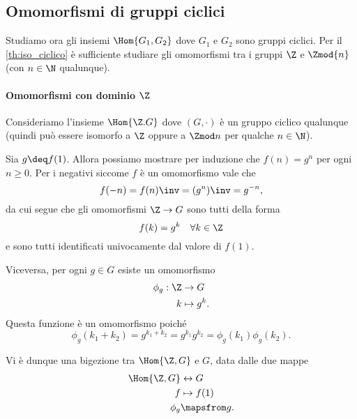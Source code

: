 \subsection{Omomorfismi di gruppi ciclici}

Studiamo ora gli insiemi $\Hom{G_1, G_2}$ dove $G_1$ e $G_2$ sono gruppi ciclici. Per il \autoref{th:iso_ciclico} è sufficiente studiare gli omomorfismi tra i gruppi $\Z$ e $\Zmod{n}$ (con $n \in \N$ qualunque).

\paragraph{Omomorfismi con dominio $\Z$} Consideriamo l'insieme $\Hom{\Z. G}$ dove $(G, \cdot)$ è un gruppo ciclico qualunque (quindi può essere isomorfo a $\Z$ oppure a $\Zmod n$ per qualche $n \in \N$). 

Sia $g \deq f(1)$. Allora possiamo mostrare per induzione che $f(n) = g^n$ per ogni $n \geq 0$. Per i negativi siccome $f$ è un omomorfismo vale che \[
    f(-n) = f(n)\inv = (g^n)\inv = g^{-n},    
\] da cui segue che gli omomorfismi $\Z \to G$ sono tutti della forma \[
    f(k) = g^k \quad \forall k \in \Z
\] e sono tutti identificati univocamente dal valore di $f(1)$.

Viceversa, per ogni $g \in G$ esiste un omomorfismo \begin{align*}
    \phi_g : \Z &\to G \\
    k &\mapsto g^k.
\end{align*} Questa funzione è un omomorfismo poiché \[
    \phi_g(k_1 + k_2) = g^{k_1 + k_2} = g^{k_1}g^{k_2} = \phi_g(k_1)\phi_g(k_2).
\]

Vi è dunque una bigezione tra $\Hom{\Z, G}$ e $G$, data dalle due mappe \begin{align*}
    \Hom{\Z, G} &\leftrightarrow G\\
    f &\mapsto f(1)\\
    \phi_g &\mapsfrom g.
\end{align*}

